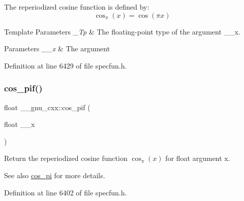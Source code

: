 The reperiodized cosine function is defined by\+: \[ \cos_\pi(x) = \cos(\pi x) \]


\begin{DoxyTemplParams}{Template Parameters}
{\em \+\_\+\+Tp} & The floating-\/point type of the argument {\ttfamily \+\_\+\+\_\+x}. \\
\hline
\end{DoxyTemplParams}

\begin{DoxyParams}{Parameters}
{\em \+\_\+\+\_\+x} & The argument \\
\hline
\end{DoxyParams}


Definition at line 6429 of file specfun.\+h.

\mbox{\label{group__mathsf__gnu_gaddcae99c1572af6fa1d79b9cfa053033}} 
\subsubsection{\texorpdfstring{cos\+\_\+pif()}{cos\_pif()}}
{\footnotesize\ttfamily float \+\_\+\+\_\+gnu\+\_\+cxx\+::cos\+\_\+pif (\begin{DoxyParamCaption}\item[{float}]{\+\_\+\+\_\+x }\end{DoxyParamCaption})\hspace{0.3cm}{\ttfamily [inline]}}

Return the reperiodized cosine function $ \cos_\pi(x) $ for {\ttfamily float} argument {\ttfamily x}.

\begin{DoxySeeAlso}{See also}
\hyperlink{group__mathsf__gnu_gafc4698ae591b0e9e61285b0794d43ef4}{cos\+\_\+pi} for more details. 
\end{DoxySeeAlso}


Definition at line 6402 of file specfun.\+h.

\mbox{\label{group__mathsf__gnu_ga9b6816c0abf30fd88417d79a33cb5465}} 
